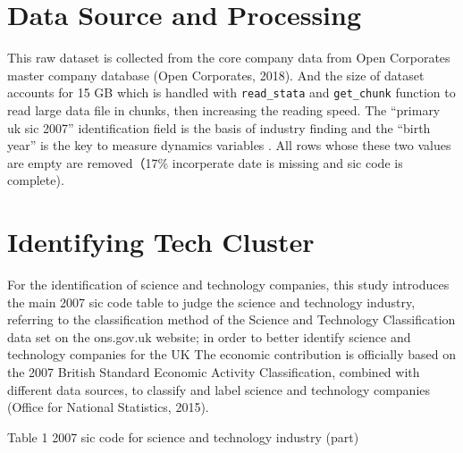 \documentclass[
  12pt,
  oneside]{book}
\begin{document}
\hypertarget{data-source-and-processing}{%
\section{Data Source and Processing}\label{data-source-and-processing}}

This raw dataset is collected from the core company data from Open Corporates master company database (Open Corporates, 2018). And the size of dataset accounts for 15 GB which is handled with \texttt{read\_stata} and \texttt{get\_chunk} function to read large data file in chunks, then increasing the reading speed. The ``primary uk sic 2007'' identification field is the basis of industry finding and the ``birth year'' is the key to measure dynamics variables . All rows whose these two values are empty are removed（17\% incorperate date is missing and sic code is complete).

\hypertarget{identifying-tech-cluster}{%
\section{Identifying Tech Cluster}\label{identifying-tech-cluster}}

For the identification of science and technology companies, this study introduces the main 2007 sic code table to judge the science and technology industry, referring to the classification method of the Science and Technology Classification data set on the ons.gov.uk website; in order to better identify science and technology companies for the UK The economic contribution is officially based on the 2007 British Standard Economic Activity Classification, combined with different data sources, to classify and label science and technology companies (Office for National Statistics, 2015).

Table 1 2007 sic code for science and technology industry (part)
\end{document}
